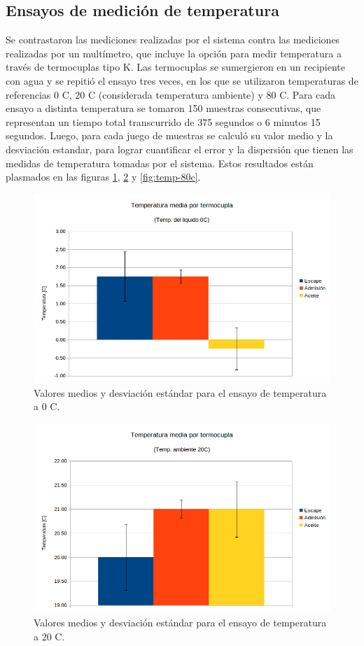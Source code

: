 \subsection{Ensayos de medición de temperatura}

Se contrastaron las mediciones realizadas por el sistema contra las mediciones realizadas por un multímetro, que incluye la opción para medir temperatura a través de termocuplas tipo K. Las termocuplas se sumergieron en un recipiente con agua y se repitió el ensayo tres veces, en los que se utilizaron temperaturas de referencias 0 \degree C, 20 \degree C (considerada temperatura ambiente) y 80 \degree C. Para cada ensayo a distinta temperatura se tomaron 150 muestras consecutivas, que representan un tiempo total transcurrido de 375 segundos o 6 minutos 15 segundos. Luego, para cada juego de muestras se calculó su valor medio y la desviación estandar, para lograr cuantificar el error y la dispersión que tienen las medidas de temperatura tomadas por el sistema. Estos resultados están plasmados en las figuras \ref{fig:temp-0c}, \ref{fig:temp-20c} y \ref{fig:temp-80c}.

\begin{figure}[htpb]
\centering
\includegraphics[width=.9\textwidth]{./Figures/temp-0c.png}
\caption{Valores medios y desviación estándar para el ensayo de temperatura a 0 \degree C.}
\label{fig:temp-0c}
\end{figure}

\begin{figure}[htpb]
\centering
\includegraphics[width=.9\textwidth]{./Figures/temp-20c.png}
\caption{Valores medios y desviación estándar para el ensayo de temperatura a 20 \degree C.}
\label{fig:temp-20c}
\end{figure}

